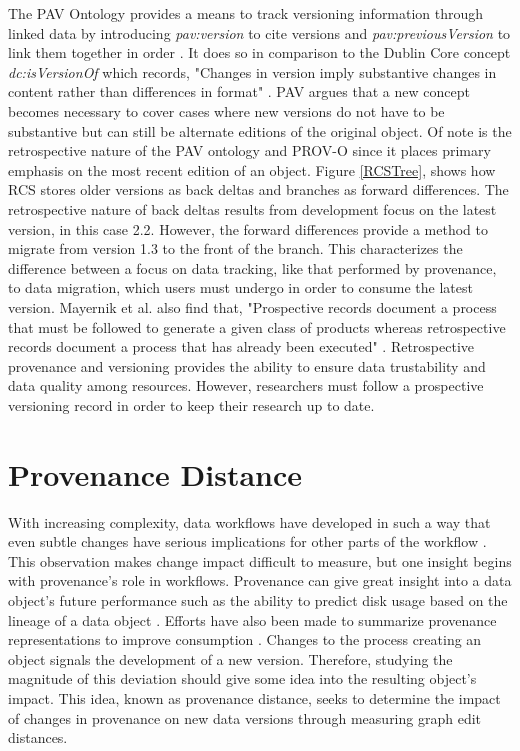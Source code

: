 The PAV Ontology provides a means to track versioning information through linked data by introducing \textit{pav:version} to cite versions and \textit{pav:previousVersion} to link them together in order \cite{Ciccarese2013}.
It does so in comparison to the Dublin Core concept \textit{dc:isVersionOf} which records, "Changes in version imply substantive changes in content rather than differences in format" \cite{DCMI2012}.
PAV argues that a new concept becomes necessary to cover cases where new versions do not have to be substantive but can still be alternate editions of the original object.
Of note is the retrospective nature of the PAV ontology and PROV-O since it places primary emphasis on the most recent edition of an object.
Figure \ref{RCSTree}, shows how RCS stores older versions as back deltas and branches as forward differences.
The retrospective nature of back deltas results from development focus on the latest version, in this case 2.2.
However, the forward differences provide a method to migrate from version 1.3 to the front of the branch.
This characterizes the difference between a focus on data tracking, like that performed by provenance, to data migration, which users must undergo in order to consume the latest version.
Mayernik et al. also find that, "Prospective records document a process that must be followed to generate a given class of products whereas retrospective records document a process that has already been executed" \cite{MatthewS.Mayernik201312-039}.
Retrospective provenance and versioning provides the ability to ensure data trustability and data quality among resources.
However, researchers must follow a prospective versioning record in order to keep their research up to date.

\section{Provenance Distance}

With increasing complexity, data workflows have developed in such a way that even subtle changes have serious implications for other parts of the workflow \cite{TILMES2011548}.
This observation makes change impact difficult to measure, but one insight begins with provenance's role in workflows.
Provenance can give great insight into a data object's future performance such as the  ability to predict disk usage based on the lineage of a data object \cite{dai2014provenance}.
Efforts have also been made to summarize provenance representations to improve consumption \cite{Ainy:2015:ASD:2806416.2806429}.
Changes to the process creating an object signals the development of a new version.
Therefore, studying the magnitude of this deviation should give some idea into the resulting object's impact.
This idea, known as provenance distance, seeks to determine the impact of changes in provenance on new data versions through measuring graph edit distances.

